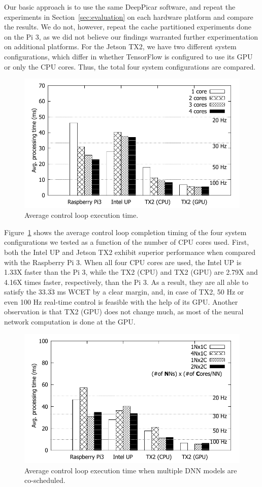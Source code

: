 Our basic approach is to use the same DeepPicar software, and repeat
the experiments in Section~\ref{sec:evaluation} on each hardware
platform and compare the results. We do not, however, repeat the cache
partitioned experiments done on the Pi 3, as we did not believe our 
findings warranted further experimentation on additional platforms. 
For the Jetson TX2, we have two different system configurations,
which differ in whether TensorFlow is configured to use its GPU or
only the CPU cores. Thus, the total four system configurations are
compared.

\begin{figure}[h]
  \centering
  \includegraphics[width=.7\textwidth]{figs/compare_core}
  \caption{Average control loop execution time.} 
  \label{fig:sys_core}
\end{figure}

Figure~\ref{fig:sys_core} shows the average control loop completion
timing of the four system configurations we tested as a function of
the number of CPU cores used.
First, both the Intel UP and Jetson TX2 exhibit superior performance when
compared with the Raspberry Pi 3. 
When all four CPU cores are used, the Intel UP is 1.33X faster than
the Pi 3, while the TX2 (CPU) and TX2 (GPU) are 2.79X and 4.16X times faster,
respectively, than the Pi 3. 
As a result, they are all able to satisfy the 33.$\overline{\mbox{33}}$ ms 
WCET by a clear margin,
and, in case of TX2, 50 Hz or even 100 Hz real-time control is
feasible with the help of its GPU. Another observation is that TX2
(GPU) does not change much, as most of the neural network computation
is done at the GPU.

\begin{figure}[h]
  \centering
  \includegraphics[width=.7\textwidth]{figs/compare_model}
  \caption{Average control loop execution time when multiple DNN
    models are co-scheduled. }
  \label{fig:sys_model}
\end{figure}

